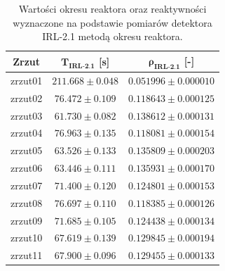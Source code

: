 \begin{table}[H]
	\centering
	\caption{Wartości okresu reaktora oraz reaktywności wyznaczone na podstawie
		pomiarów detektora IRL-2.1 metodą okresu reaktora.}
	\renewcommand{\arraystretch}{1.2}
	\begin{tabular}{|c|c|c|}
		\hline
		\textbf{Zrzut} &
		$\boldsymbol{T_{\text{IRL-2.1}}}$ [s] &
		$\boldsymbol{\rho_{\text{IRL-2.1}}}$ [-] \\
		\hline
		zrzut01 & $211.668 \pm 0.048$ & $0.051996 \pm 0.000010$ \\
		zrzut02 & $76.472 \pm 0.109$  & $0.118643 \pm 0.000125$ \\
		zrzut03 & $61.730 \pm 0.082$  & $0.138612 \pm 0.000131$ \\
		zrzut04 & $76.963 \pm 0.135$  & $0.118081 \pm 0.000154$ \\
		zrzut05 & $63.526 \pm 0.133$  & $0.135809 \pm 0.000203$ \\
		zrzut06 & $63.446 \pm 0.111$  & $0.135931 \pm 0.000170$ \\
		zrzut07 & $71.400 \pm 0.120$  & $0.124801 \pm 0.000153$ \\
		zrzut08 & $76.697 \pm 0.110$  & $0.118385 \pm 0.000126$ \\
		zrzut09 & $71.685 \pm 0.105$  & $0.124438 \pm 0.000134$ \\
		zrzut10 & $67.619 \pm 0.139$  & $0.129845 \pm 0.000194$ \\
		zrzut11 & $67.900 \pm 0.096$  & $0.129455 \pm 0.000133$ \\
		\hline
	\end{tabular}
	\label{tab:IRL21}
\end{table}


